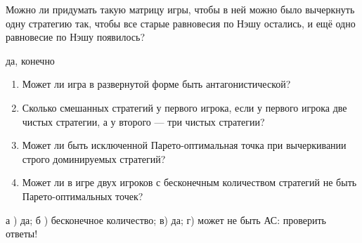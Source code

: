 \begin{problem}
 Можно ли придумать такую матрицу игры, чтобы в ней можно было вычеркнуть одну стратегию так, чтобы все старые равновесия по Нэшу остались, и ещё одно равновесие по Нэшу появилось?

\begin{sol}
 да, конечно
\end{sol}
\end{problem}

\begin{problem} 

\begin{enumerate}
\item Может ли игра в развернутой форме быть антагонистической?\par
\item Сколько смешанных стратегий у первого игрока, если у первого игрока две чистых стратегии, а у второго --- три чистых стратегии?\par
\item  Может ли быть исключенной Парето-оптимальная точка при вычеркивании строго доминируемых стратегий?\par
\item Может ли в игре двух игроков с бесконечным количеством стратегий не быть Парето-оптимальных точек?
\end{enumerate}


\begin{sol}
а ) да; б ) бесконечное количество; в) да; г) может не быть 
{\red АС: проверить ответы!}
\end{sol}
\end{problem}





